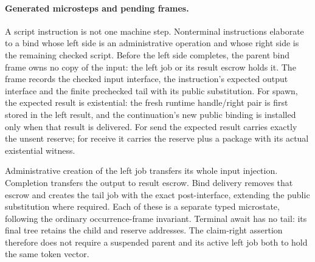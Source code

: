 \documentclass[11pt]{article}
\begin{document}
\paragraph{Generated microsteps and pending frames.}
A script instruction is not one machine step. Nonterminal instructions elaborate to a bind whose left side is an administrative operation and whose right side is the remaining checked script. Before the left side completes, the parent bind frame owns no copy of the input: the left job or its result escrow holds it. The frame records the checked input interface, the instruction's expected output interface and the finite prechecked tail with its public substitution. For spawn, the expected result is existential: the fresh runtime handle/right pair is first stored in the left result, and the continuation's new public binding is installed only when that result is delivered. For send the expected result carries exactly the unsent reserve; for receive it carries the reserve plus a package with its actual existential witness.

Administrative creation of the left job transfers its whole input injection. Completion transfers the output to result escrow. Bind delivery removes that escrow and creates the tail job with the exact post-interface, extending the public substitution where required. Each of these is a separate typed microstate, following the ordinary occurrence-frame invariant. Terminal await has no tail: its final tree retains the child and reserve addresses. The claim-right assertion therefore does not require a suspended parent and its active left job both to hold the same token vector.
\end{document}
